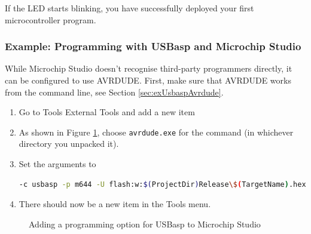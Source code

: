 \documentclass{article}
\newcommand{\file}[1]{\texttt{#1}}
\begin{document}
If the LED starts blinking, you have successfully deployed your first microcontroller program. 

\FloatBarrier
\subsubsection{Example: Programming with USBasp and Microchip Studio}\label{sec:exMchpStudioProg}
While Microchip Studio doesn't recognise third-party programmers directly, it can be configured to use AVRDUDE. First, make sure that AVRDUDE works from the command line, see Section \ref{sec:exUsbaspAvrdude}. 

\begin{enumerate}
\item Go to Tools \textrightarrow{} External Tools and add a new item 
\item As shown in Figure \ref{fig:microchipStudioUSBasp}, choose \file{avrdude.exe} for the command (in whichever directory you unpacked it). 
\item Set the arguments to
\begin{lstlisting}[language=bash]
-c usbasp -p m644 -U flash:w:$(ProjectDir)Release\$(TargetName).hex:i
\end{lstlisting}
\item There should now be a new item in the Tools menu. 
\end{enumerate}

\begin{figure}[htb]
\centering
{}
\caption{Adding a programming option for USBasp to Microchip Studio}
\label{fig:microchipStudioUSBasp}
\end{figure}
\end{document}
